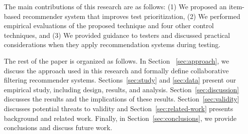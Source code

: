 The main contributions of this research are as follows:
(1) We proposed an item-based recommender system that improves test prioritization, 
(2) We performed empirical evaluations of the proposed technique and four other control techniques, and
(3) We provided guidance to testers and discussed practical considerations when
    they apply recommendation systems during testing.

The rest of the paper is organized as follows. In Section ~\ref{sec:approach}, we
discuss the approach used in this research and formally define
collaborative filtering recommender systems. 
Sections~\ref{sec:study} and \ref{sec:data} present our empirical study,
including design, results, and analysis.
Section~\ref{sec:discussion} discusses the results and the implications of these results. 
Section~\ref{sec:validity} discusses potential threats to validity and
Section~\ref{sec:related-work} presents background and related work. 
Finally, in Section~\ref{sec:conclusions}, 
we provide conclusions and discuss future work.

